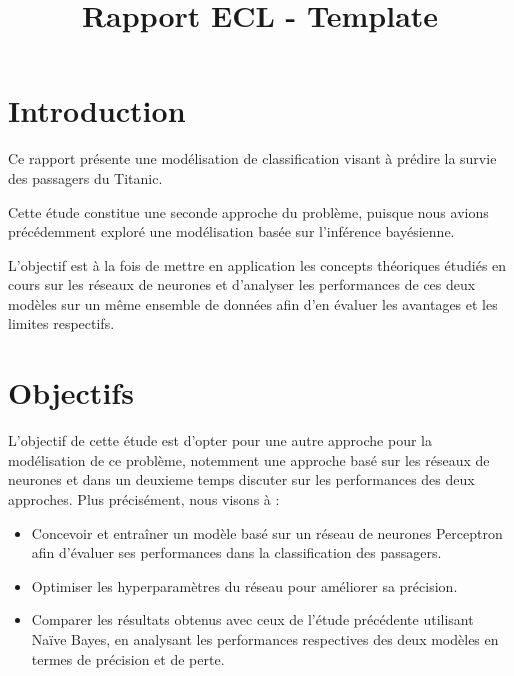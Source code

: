 \documentclass{rapportECL}
\title{Rapport ECL - Template} %
\begin{document}




        
\fairemarges %
\fairepagedegarde %
\tabledematieres %




\section{Introduction} 
Ce rapport présente une modélisation de classification visant à prédire la survie des passagers du Titanic.

Cette étude constitue une seconde approche du problème, puisque nous avions précédemment exploré une modélisation basée sur l’inférence bayésienne.

L’objectif est à la fois de mettre en application les concepts théoriques étudiés en cours sur les réseaux de neurones et d’analyser les performances de ces deux modèles sur un même ensemble de données afin d’en évaluer les avantages et les limites respectifs.

\section{Objectifs}
L'objectif de cette étude est d'opter pour une autre approche pour la modélisation de ce problème, notemment une approche basé sur
les réseaux de neurones et dans un deuxieme temps discuter sur les performances des deux approches.
Plus précisément, nous visons à :
\begin{itemize}
    \item Concevoir et entraîner un modèle basé sur un réseau de neurones Perceptron afin d'évaluer ses performances dans la classification des passagers.
    \item Optimiser les hyperparamètres du réseau pour améliorer sa précision.
    \item Comparer les résultats obtenus avec ceux de l’étude précédente utilisant Naïve Bayes, en analysant les performances respectives des deux modèles en termes de précision et de perte.
\end{itemize}
\end{document}
